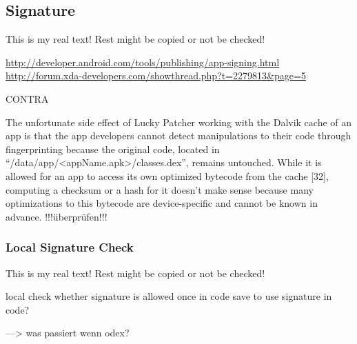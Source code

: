 \subsection{Signature}\label{subsection:counter-tampering-signature}

This is my real text! Rest might be copied or not be checked!


\url{http://developer.android.com/tools/publishing/app-signing.html}\newline
\url{http://forum.xda-developers.com/showthread.php?t=2279813&page=5}\newline

CONTRA\newline


The unfortunate side effect of Lucky Patcher working with the Dalvik cache of an app is that the app developers cannot detect manipulations to their code through fingerprinting because the original code, located in “/data/app/<appName.apk>/classes.dex”, remains untouched. While it is allowed for an app to access its own optimized bytecode from the cache [32], computing a checksum or a hash for it doesn’t make sense because many optimizations to this bytecode are device-specific and cannot be known in advance.
\cite{munteanLicense}
!!!überprüfen!!!


\subsubsection{Local Signature Check} \label{subsubsection:counter-tampering-signature-local}
This is my real text! Rest might be copied or not be checked!



local check whether signature is allowed\newline
once in code \newline
save to use signature in code?\newline



---> was passiert wenn odex?
